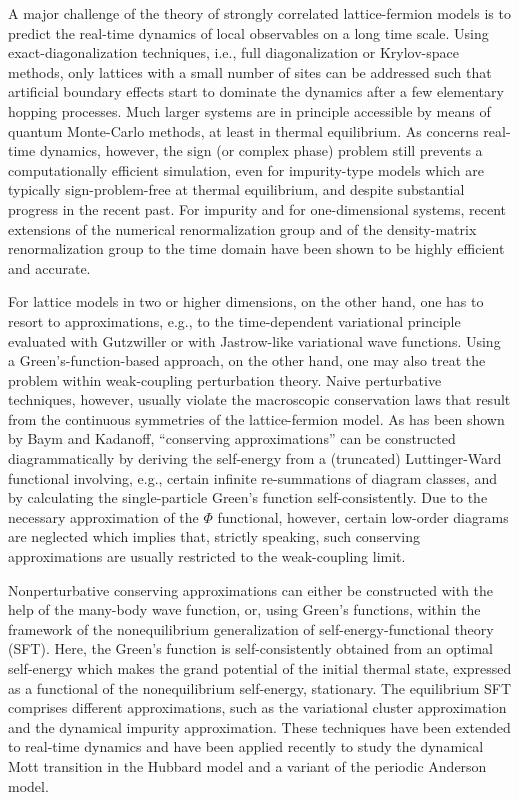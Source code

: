 \documentclass[twocolumn,prb,showpacs,aps,superscriptaddress]{revtex4}
\begin{document}
A major challenge of the theory of strongly correlated lattice-fermion models
is to predict the real-time dynamics of local observables on a long time scale.
\cite{PSSV11,ATE+14} Using exact-diagonalization techniques, i.e., full
diagonalization or Krylov-space methods, \cite{HL97} only lattices with a small
number of sites can be addressed such that artificial boundary effects start to
dominate the dynamics after a few elementary hopping processes.  Much larger
systems are in principle accessible by means of quantum Monte-Carlo methods, at
least in thermal equilibrium. \cite{BSS81,WSSB89,AE08} As concerns real-time
dynamics, however, the sign (or complex phase) problem still prevents a
computationally efficient simulation, even for impurity-type models which are
typically sign-problem-free at thermal equilibrium, and despite substantial
progress in the recent past. \cite{MR08,WOM09,SF09,CGRM15} For impurity and for
one-dimensional systems, recent extensions of the numerical renormalization
group \cite{AS05} and of the density-matrix renormalization group
\cite{WF04,Vid04,HLO+16} to the time domain have been shown to be highly
efficient and accurate.

For lattice models in two or higher dimensions, on the other hand, one has to
resort to approximations, e.g., to the time-dependent variational principle
evaluated with Gutzwiller \cite{SSF12} or with Jastrow-like variational wave
functions. \cite{IOI15,CBSF12} Using a Green's-function-based approach, on the
other hand, one may also treat the problem within weak-coupling perturbation
theory.  Naive perturbative techniques, however, usually violate the
macroscopic conservation laws that result from the continuous symmetries of the
lattice-fermion model.  As has been shown by Baym and Kadanoff,
\cite{BK61,Bay62} ``conserving approximations'' can be constructed
diagrammatically by deriving the self-energy from a (truncated) Luttinger-Ward
functional \cite{LW60} involving, e.g., certain infinite re-summations of
diagram classes, and by calculating the single-particle Green's function
self-consistently. Due to the necessary approximation of the $\Phi$ functional,
however, certain low-order diagrams are neglected which implies that, strictly
speaking, such conserving approximations are usually restricted to the
weak-coupling limit. \cite{BSW89,Joura:15}

Nonperturbative conserving approximations can either be constructed with the
help of the many-body wave function,\cite{SSF12,IOI15} or, using Green's
functions, within the framework of the nonequilibrium generalization
\cite{HEAP13} of self-energy-functional theory (SFT). \cite{Pot03a,Pot12} Here,
the Green's function is self-consistently obtained from an optimal self-energy
which makes the grand potential of the initial thermal state, expressed as a
functional of the nonequilibrium self-energy, stationary.  The equilibrium SFT
comprises different approximations, such as the variational cluster
approximation \cite{PAD03,DAH+04} and the dynamical impurity approximation.
\cite{Pot03b} These techniques have been extended to real-time dynamics and
have been applied recently to study the dynamical Mott transition \cite{EKW09}
in the Hubbard model \cite{HEP16a,HEP16b} and a variant of the periodic
Anderson model.  \cite{HP16}
\end{document}
